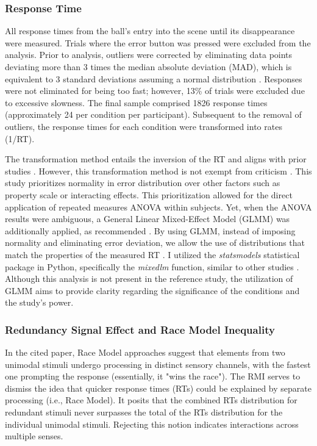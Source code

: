 \documentclass[12pt,oneside,openright]{report}
\begin{document}
\subsubsection*{Response Time}

All response times from the ball's entry into the scene until its disappearance were measured. Trials where the error button was pressed were excluded from the analysis. Prior to analysis, outliers were corrected by eliminating data points deviating more than 3 times the median absolute deviation (MAD), which is equivalent to 3 standard deviations assuming a normal distribution \parencite{Innes2019ACA}. Responses were not eliminated for being too fast; however, 13\% of trials were excluded due to excessive slowness. The final sample comprised 1826 response times (approximately 24 per condition per participant). Subsequent to the removal of outliers, the response times for each condition were transformed into rates (1/RT).

The transformation method entails the inversion of the RT and aligns with prior studies \parencite{Innes2019ACA}. However, this transformation method is not exempt from criticism \parencite{Lo2015-fv}. This study prioritizes normality in error distribution over other factors such as property scale or interacting effects. This prioritization allowed for the direct application of repeated measures ANOVA within subjects. Yet, when the ANOVA results were ambiguous, a General Linear Mixed-Effect Model (GLMM) was additionally applied, as recommended \parencite{Lo2015-fv}. By using GLMM, instead of imposing normality and eliminating error deviation, we allow the use of distributions that match the properties of the measured RT \parencite{Lo2015-fv}. I utilized the \textit{statsmodels} statistical package in Python, specifically the \textit{mixedlm} function, similar to other studies \parencite{RSE_FBI}. Although this analysis is not present in the reference study, the utilization of GLMM aims to provide clarity regarding the significance of the conditions and the study's power.

\subsubsection*{Redundancy Signal Effect and Race Model Inequality}

In the cited paper, Race Model approaches suggest that elements from two unimodal stimuli undergo processing in distinct sensory channels, with the fastest one prompting the response (essentially, it "wins the race"). The RMI serves to dismiss the idea that quicker response times (RTs) could be explained by separate processing (i.e., Race Model). It posits that the combined RTs distribution for redundant stimuli never surpasses the total of the RTs distribution for the individual unimodal stimuli. Rejecting this notion indicates interactions across multiple senses.
\end{document}
